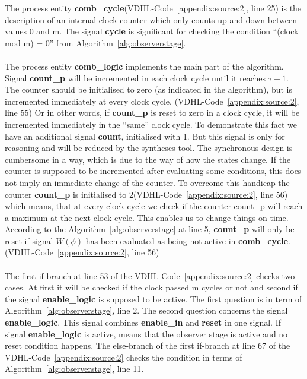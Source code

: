 \newline \newline
The process entity \textbf{comb\_cycle}(VDHL-Code~\ref{appendix:source:2}, line 25) is the description of an internal clock counter which only counts up and down between values 0 and m. 
The signal \textbf{cycle} is significant for checking the condition ``(clock mod m) = 0'' from Algorithm~\ref{alg:observerstage}. \\ \\
The process entity \textbf{comb\_logic} implements the main part of the algorithm. 
Signal \textbf{count\_p} will be incremented in each clock cycle until it reaches $\tau+1$. 
The counter should be initialised to zero (as indicated in the algorithm), but is incremented immediately at every clock cycle. (VDHL-Code~\ref{appendix:source:2}, line 55)
Or in other words, if \textbf{count\_p} is reset to zero in a clock cycle, it will be incremented immediately in the ``same'' clock cycle. 
To demonstrate this fact we have an additional signal \textbf{count}, initialised with 1. 
But this signal is only for reasoning and will be reduced by the syntheses tool.  
The synchronous design is cumbersome in a way, which is due to the way of how the states change. 
If the counter is supposed to be incremented after evaluating some conditions, this does not imply an immediate change of the counter. 
To overcome this handicap the counter  \textbf{count\_p} is initialised to 2(VDHL-Code~\ref{appendix:source:2}, line 56) which means, that 
at every clock cycle we check if the counter count\_p will reach a maximum at the next clock cycle. This enables us to change things on time. 
According to the Algorithm~\ref{alg:observerstage} at line 5, \textbf{count\_p} will only be reset if signal $W(\phi)$ has been evaluated as being not active in \textbf{comb\_cycle}. 
(VDHL-Code~\ref{appendix:source:2}, line 56) \\\\
The first if-branch at line 53 of the VDHL-Code~\ref{appendix:source:2} checks two cases. 
At first it will be checked if the clock passed m cycles or not and second if the signal \textbf{enable\_logic} is supposed to be active. 
The first question is in term of Algorithm~\ref{alg:observerstage}, line 2. 
The second question concerns the signal \textbf{enable\_logic}. This signal combines \textbf{enable\_in} and \textbf{reset} in one signal. 
If signal \textbf{enable\_logic} is active, means that the observer stage is active and no reset condition happens. 
The else-branch of the first if-branch at line 67  of the VDHL-Code~\ref{appendix:source:2} checks the condition in terms of  Algorithm~\ref{alg:observerstage}, line 11. 

